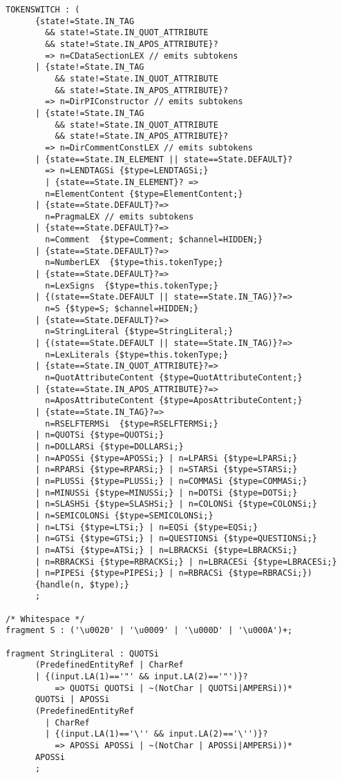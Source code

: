 \begin{Verbatim}[frame=none, fontsize=\footnotesize]
TOKENSWITCH : (
      {state!=State.IN_TAG 
        && state!=State.IN_QUOT_ATTRIBUTE 
        && state!=State.IN_APOS_ATTRIBUTE}?
        => n=CDataSectionLEX // emits subtokens
      | {state!=State.IN_TAG 
          && state!=State.IN_QUOT_ATTRIBUTE
          && state!=State.IN_APOS_ATTRIBUTE}?
        => n=DirPIConstructor // emits subtokens
      | {state!=State.IN_TAG 
          && state!=State.IN_QUOT_ATTRIBUTE 
          && state!=State.IN_APOS_ATTRIBUTE}?
        => n=DirCommentConstLEX // emits subtokens
      | {state==State.IN_ELEMENT || state==State.DEFAULT}?
        => n=LENDTAGSi {$type=LENDTAGSi;}
        | {state==State.IN_ELEMENT}? =>
        n=ElementContent {$type=ElementContent;} 
      | {state==State.DEFAULT}?=>
        n=PragmaLEX // emits subtokens
      | {state==State.DEFAULT}?=>
        n=Comment  {$type=Comment; $channel=HIDDEN;}
      | {state==State.DEFAULT}?=> 
        n=NumberLEX  {$type=this.tokenType;}
      | {state==State.DEFAULT}?=>
        n=LexSigns  {$type=this.tokenType;}
      | {(state==State.DEFAULT || state==State.IN_TAG)}?=>
        n=S {$type=S; $channel=HIDDEN;}
      | {state==State.DEFAULT}?=>
        n=StringLiteral {$type=StringLiteral;}
      | {(state==State.DEFAULT || state==State.IN_TAG)}?=>
        n=LexLiterals {$type=this.tokenType;}              
      | {state==State.IN_QUOT_ATTRIBUTE}?=>
        n=QuotAttributeContent {$type=QuotAttributeContent;}
      | {state==State.IN_APOS_ATTRIBUTE}?=>
        n=AposAttributeContent {$type=AposAttributeContent;}
      | {state==State.IN_TAG}?=>
        n=RSELFTERMSi  {$type=RSELFTERMSi;}
      | n=QUOTSi {$type=QUOTSi;}
      | n=DOLLARSi {$type=DOLLARSi;}        
      | n=APOSSi {$type=APOSSi;} | n=LPARSi {$type=LPARSi;}
      | n=RPARSi {$type=RPARSi;} | n=STARSi {$type=STARSi;}
      | n=PLUSSi {$type=PLUSSi;} | n=COMMASi {$type=COMMASi;}
      | n=MINUSSi {$type=MINUSSi;} | n=DOTSi {$type=DOTSi;}
      | n=SLASHSi {$type=SLASHSi;} | n=COLONSi {$type=COLONSi;}
      | n=SEMICOLONSi {$type=SEMICOLONSi;}
      | n=LTSi {$type=LTSi;} | n=EQSi {$type=EQSi;}
      | n=GTSi {$type=GTSi;} | n=QUESTIONSi {$type=QUESTIONSi;}
      | n=ATSi {$type=ATSi;} | n=LBRACKSi {$type=LBRACKSi;}
      | n=RBRACKSi {$type=RBRACKSi;} | n=LBRACESi {$type=LBRACESi;}
      | n=PIPESi {$type=PIPESi;} | n=RBRACSi {$type=RBRACSi;})
      {handle(n, $type);}  
      ;

/* Whitespace */
fragment S : ('\u0020' | '\u0009' | '\u000D' | '\u000A')+;

fragment StringLiteral : QUOTSi
      (PredefinedEntityRef | CharRef 
      | {(input.LA(1)=='"' && input.LA(2)=='"')}?
          => QUOTSi QUOTSi | ~(NotChar | QUOTSi|AMPERSi))* 
      QUOTSi | APOSSi 
      (PredefinedEntityRef 
        | CharRef 
        | {(input.LA(1)=='\'' && input.LA(2)=='\'')}?
          => APOSSi APOSSi | ~(NotChar | APOSSi|AMPERSi))* 
      APOSSi
      ;


\end{Verbatim}
